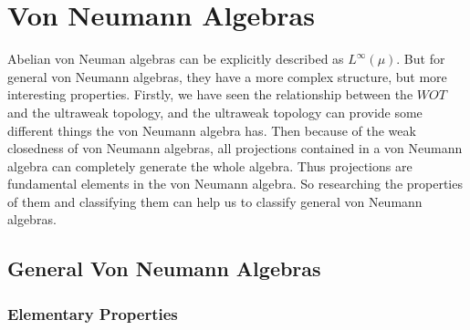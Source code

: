 \chapter{Von Neumann Algebras}

Abelian von Neuman algebras can be explicitly described as $L^{\infty}(\mu)$. But for general von Neumann algebras, they have a more complex structure, but more interesting properties. Firstly, we have seen the relationship between the $WOT$ and the ultraweak topology, and the ultraweak topology can provide some different things the von Neumann algebra has. Then because of the weak closedness of von Neumann algebras, all projections contained in a von Neumann algebra can completely generate the whole algebra. Thus projections are fundamental elements in the von Neumann algebra. So researching the properties of them and classifying them can help us to classify general von Neumann algebras.

\section{General Von Neumann Algebras}

\subsection{Elementary Properties}

